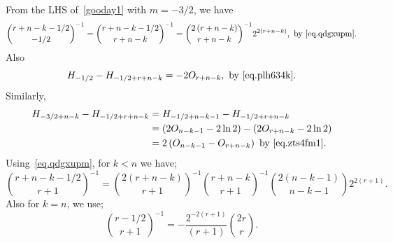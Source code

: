 \documentclass[12pt,reqno]{article}
\begin{document}
From the LHS of~\eqref{gooday1} with $m=-3/2$, we have
\begin{equation}\label{mn5v94x}
\binom{{r + n - k - 1/2}}{{ - 1/2}}^{ - 1} = \binom{{r + n - k - 1/2}}{{r + n - k}}^{ - 1} = \binom{{2\left( {r + n - k} \right)}}{{r + n - k}}^{ - 1} 2^{2\left( {r + n - k} \right)} ,\text{ by~\eqref{eq.qdgxupm}.}
\end{equation}
Also
\begin{equation}\label{mdxkxi4}
H_{ - 1/2}  - H_{ - 1/2 + r + n - k} = - 2O_{r + n - k},\text{ by~\eqref{eq.plh634k}}.
\end{equation}
Similarly,
\begin{align}\label{zj8qis2}
H_{ - 3/2 + n - k} - H_{ - 1/2 + r + n - k} &= H_{ - 1/2 + n - k - 1}  - H_{ - 1/2 + r + n - k}\nonumber \\
& = \left( {2O_{n - k - 1} - 2\ln 2} \right) - \left( {2O_{r + n - k}  - 2\ln 2} \right)\nonumber\\
& = 2\left( {O_{n - k - 1} - O_{r + n - k} } \right)\text{ by~\eqref{eq.zts4fm1}}.
\end{align}
Using~\eqref{eq.qdgxupm}, for $k<n$ we have;
\begin{equation}\label{kgwmxux}
\binom{{r + n - k - 1/2}}{{r + 1}}^{ - 1} = \binom{{2\left( {r + n - k} \right)}}{{r + 1}}^{ - 1} \binom{{r + n - k}}{{r + 1}}^{ - 1} \binom{{2\left( {n - k - 1} \right)}}{{n - k - 1}}2^{2(r + 1)}. 
\end{equation}
Also for $k=n$, we use;
\begin{equation}\label{kgwmxuxuu}
	\binom{{r  - 1/2}}{{r + 1}}^{ - 1}  = -\frac{2^{-2(r + 1)}}{(r+1)}\binom{2r}{r}. 
\end{equation}
\end{document}

